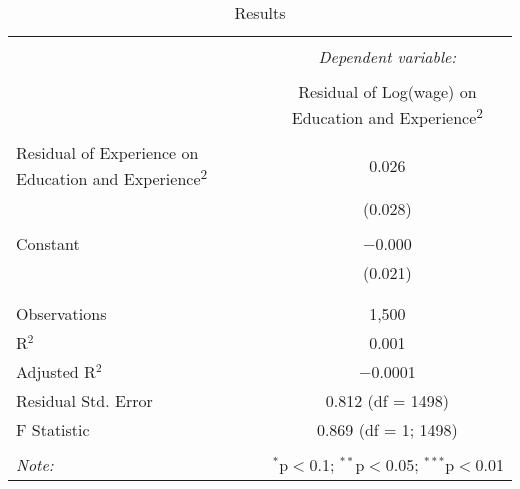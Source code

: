 
\begin{table}[!htbp] \centering 
  \caption{Results} 
  \label{tab:question-5-c} 
\begin{tabular}{@{\extracolsep{5pt}}lc} 
\\[-1.8ex]\hline 
\hline \\[-1.8ex] 
 & \multicolumn{1}{c}{\textit{Dependent variable:}} \\ 
\cline{2-2} 
\\[-1.8ex] & Residual of Log(wage) on Education and Experience\textsuperscript{2} \\ 
\hline \\[-1.8ex] 
 Residual of Experience on Education and Experience\textsuperscript{2} & 0.026 \\ 
  & (0.028) \\ 
  & \\ 
 Constant & $-$0.000 \\ 
  & (0.021) \\ 
  & \\ 
\hline \\[-1.8ex] 
Observations & 1,500 \\ 
R$^{2}$ & 0.001 \\ 
Adjusted R$^{2}$ & $-$0.0001 \\ 
Residual Std. Error & 0.812 (df = 1498) \\ 
F Statistic & 0.869 (df = 1; 1498) \\ 
\hline 
\hline \\[-1.8ex] 
\textit{Note:}  & \multicolumn{1}{r}{$^{*}$p$<$0.1; $^{**}$p$<$0.05; $^{***}$p$<$0.01} \\ 
\end{tabular} 
\end{table} 
